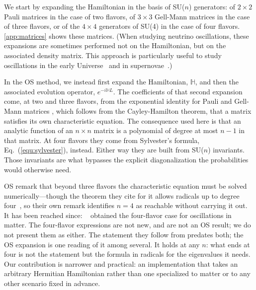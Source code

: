 \documentclass[final,5p,times,twocolumn,sort,compress]{elsarticle}
\newcommand{\eq}{Eq.}
\providecommand{\Ref}{}
\newcommand{\equ}[1]{\eq~(\ref{equ:#1})}
\begin{document}
We start by expanding the Hamiltonian in the basis of SU($n$) generators: of $2 \times 2$ Pauli matrices in the case of two flavors, of $3 \times 3$ Gell-Mann matrices in the case of three flavors, or of the $4 \times 4$ generators of SU(4) in the case of four flavors.  \ref{app:matrices} shows these matrices.  (When studying neutrino oscillations, these expansions are sometimes performed not on the Hamiltonian, but on the associated density matrix.  This approach is particularly useful to study oscillations in the early Universe\ \cite{McKellar:1992ja, Bell:1998ds, Hannestad:2001iy, Wong:2002fa, Hannestad:2012ky, Boriero:2017tkh} and in supernovae\ \cite{Pantaleone:1994ns, Sigl:1994hc, Pastor:2002we, Balantekin:2004ug, Fogli:2007bk, Dasgupta:2007ws, Duan:2010bg, Mirizzi:2015eza}.)

In the OS method, we instead first expand the Hamiltonian, $\mathbb{H}$, and then the associated evolution operator, $e^{-i\mathbb{H}L}$. The coefficients of that second expansion come, at two and three flavors, from the exponential identity for Pauli and Gell-Mann matrices \cite{MacFarlane:1968vc, Curtright:2015iba, VanKortryk:2015kua}, which follows from the Cayley-Hamilton theorem, that a matrix satisfies its own characteristic equation.  The consequence used here is that an analytic function of an $n \times n$ matrix is a polynomial of degree at most $n-1$ in that matrix. At four flavors they come from Sylvester's formula, \equ{sylvester}, instead.  Either way they are built from SU($n$) invariants.  Those invariants are what bypasses the explicit diagonalization the probabilities would otherwise need.

OS remark that beyond three flavors the characteristic equation must be solved numerically---though the theorem they cite for it allows radicals up to degree four~\cite{Kusnezov:1995, VanKortryk:2015kua}, so their own remark identifies $n=4$ as reachable without carrying it out.  It has been reached since: \Ref~\cite{Kamo:2002sj} obtained the four-flavor case for oscillations in matter.  The four-flavor expressions are not new, and are not an OS result; we do not present them as either.  The statement they follow from predates both; the OS expansion is one reading of it among several.  It holds at any $n$: what ends at four is not the statement but the formula in radicals for the eigenvalues it needs.  Our contribution is narrower and practical: an implementation that takes an arbitrary Hermitian Hamiltonian rather than one specialized to matter or to any other scenario fixed in advance.
\end{document}
